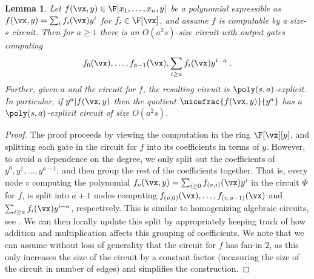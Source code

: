 \documentclass[11pt]{article}
\numberwithin{equation}{section}
\newtheorem{lemma}[theorem]{Lemma}
\theoremstyle{definition}
\theoremstyle{plain}
\begin{document}
\begin{lemma}\label{res:divide-by-y:white-box}
        Let $f(\vx,y)\in\F[x_1,\ldots,x_n,y]$ be a polynomial expressible as $f(\vx,y)=\sum_i f_i(\vx)y^i$ for $f_i\in\F[\vx]$, and assume $f$ is computable by a size-$s$ circuit. Then for $a\ge 1$ there is an $O(a^2s)$-size circuit with output gates computing
        \[
                f_0(\vx),\ldots,f_{a-1}(\vx),\sum_{i\ge a} f_i(\vx) y^{i-a}
                \;.
        \]
        Further, given $a$ and the circuit for $f$, the resulting circuit is $\poly(s,a)$-explicit.  In particular, if $y^a|f(\vx,y)$ then the quotient $\nicefrac{f(\vx,y)}{y^a}$ has a $\poly(s,a)$-explicit circuit of size $O(a^2s)$.
\end{lemma}
\begin{proof}
        The proof proceeds by viewing the computation in the ring $\F[\vx][y]$, and splitting each gate in the circuit for $f$ into its coefficients in terms of $y$.  However, to avoid a dependence on the degree, we only split out the coefficients of $y^0,y^1,\ldots,y^{a-1}$, and then group the rest of the coefficients together.  That is,  every node $v$ computing the polynomial $f_v(\vx,y)=\sum_{i\ge 0} f_{(v,i)}(\vx)y^i$ in the circuit $\Phi$ for $f$, is split into $a+1$ nodes computing $f_{(v,0)}(\vx),\dots,f_{(v,a-1)}(\vx)$ and $\sum_{i\ge a} f_i(\vx)y^{i-a}$, respectively. This is similar to homogenizing algebraic circuits, see \cite{SY10}.
%
%
%
%
We can then locally update this split by appropriately keeping track of how addition and multiplication affects this grouping of coefficients.  We note that we can assume without loss of generality that the circuit for $f$ has fan-in 2, as this only increases the size of the circuit by a constant factor (measuring the size of the circuit in number of edges) and simplifies the construction.
%


\end{proof}
\end{document}
